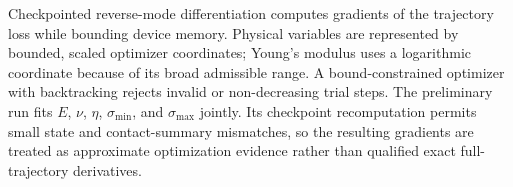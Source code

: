 Checkpointed reverse-mode differentiation computes gradients of the trajectory loss while bounding device memory. Physical variables are represented by bounded, scaled optimizer coordinates; Young's modulus uses a logarithmic coordinate because of its broad admissible range. A bound-constrained optimizer with backtracking rejects invalid or non-decreasing trial steps. The preliminary run fits $E$, $\nu$, $\eta$, $\sigma_{\min}$, and $\sigma_{\max}$ jointly. Its checkpoint recomputation permits small state and contact-summary mismatches, so the resulting gradients are treated as approximate optimization evidence rather than qualified exact full-trajectory derivatives.
